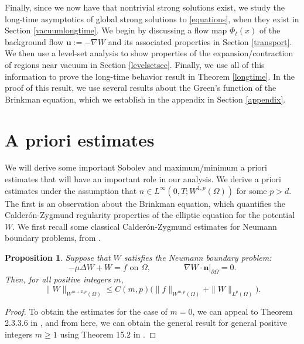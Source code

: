 \documentclass[12pt]{article}
\newcommand{\bd}{\boldsymbol}
\theoremstyle{plain}
\newtheorem{proposition}{Proposition}[section]
\begin{document}
Finally, since we now have that nontrivial strong solutions exist, we study the long-time asymptotics of global strong solutions to \eqref{equations}, when they exist in Section \ref{vacuumlongtime}. We begin by discussing a flow map $\Phi_{t}(x)$ of the background flow $\bd{u} := -\nabla W$ and its associated properties in Section \ref{transport}. We then use a level-set analysis to show properties of the expansion/contraction of regions near vacuum in Section \ref{levelsetsec}. Finally, we use all of this information to prove the long-time behavior result in Theorem \ref{longtime}. In the proof of this result, we use several results about the Green's function of the Brinkman equation, which we establish in the appendix in Section \ref{appendix}.

\section{A priori estimates}\label{apriori}

We will derive some important Sobolev and maximum/minimum a priori estimates that will have an important role in our analysis. We derive a priori estimates under the assumption that $n \in L^{\infty}(0, T; W^{1, p}(\Omega))$ for some $p > d$. The first is an observation about the  Brinkman equation, which quantifies the Calder\'{o}n-Zygmund regularity properties of the elliptic equation for the potential $W$. We first recall some classical Calder\'{o}n-Zygmund estimates for Neumann boundary problems, from \cite{ADN, Grisvard}.

\begin{proposition}\label{CZest}
Suppose that $W$ satisfies the Neumann boundary problem:
\begin{equation*}
-\mu \Delta W + W = f \text{ on } \Omega, \qquad \qquad \nabla W \cdot \bd{n}|_{\partial \Omega} = 0.
\end{equation*}
Then, for all positive integers $m$, 
\begin{equation*}
\|W\|_{W^{m + 2, p}(\Omega)} \le C(m, p) \Big(\|f\|_{W^{m, p}(\Omega)} + \|W\|_{L^{p}(\Omega)}\Big).
\end{equation*}
\end{proposition}
\begin{proof}
To obtain the estimates for the case of $m = 0$, we can appeal to Theorem 2.3.3.6 in \cite{Grisvard}, and from here, we can obtain the general result for general positive integers $m \ge 1$ using Theorem 15.2 in \cite{ADN}.
\end{proof}
\end{document}
